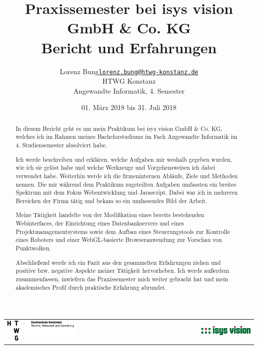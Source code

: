 \documentclass[xcolor=dvipsnames,11pt,paper=a4paper]{report}
\title{
	\Huge\textbf{Praxissemester bei isys vision GmbH \& Co. KG}\\\vspace{20pt}
	\huge{Bericht und Erfahrungen}
}
\author{
	\begin{tabular}{l l}
	Lorenz Bung &
	\href{mailto:lorenz.bung@htwg-konstanz.de}{\texttt{lorenz.bung@htwg-konstanz.de}}\\
	&HTWG Konstanz\\
	&Angewandte Informatik, 4. Semester
	\end{tabular}
}
\date{01. März 2018 bis 31. Juli 2018}
\begin{document}

\begin{titlepage}
\begin{tabular}{l r}
\includegraphics[width=0.5\textwidth]{media/htwg.png} &
\includegraphics[width=0.5\textwidth]{media/isys.png}
\end{tabular}
{\let\newpage\relax\maketitle}
\end{titlepage}

\begin{abstract}
In diesem Bericht geht es um mein Praktikum bei isys vision GmbH \& Co. KG, welches
ich im Rahmen meines Bachelorstudiums im Fach Angewandte Informatik im 4. Studiensemester
absolviert habe.

Ich werde beschreiben und erklären, welche Aufgaben mir weshalb gegeben wurden,
wie ich sie gelöst habe und welche Werkzeuge und Vorgehensweisen ich dabei verwendet
habe. Weiterhin werde ich die firmeninternen Abläufe, Ziele und Methoden nennen.
Die mir während dem Praktikum zugeteilten Aufgaben umfassten ein breites Spektrum mit dem Fokus
Webentwicklung und Javascript. Dabei war ich in mehreren Bereichen der Firma
tätig und bekam so ein umfassendes Bild der Arbeit.

Meine Tätigkeit handelte von der Modifikation eines bereits bestehenden Webinterfaces, der Einrichtung eines Datenbankservers und eines Projektmanagementsystems sowie dem Aufbau eines Steuerungstools zur Kontrolle eines Roboters und einer WebGL-basierte Browseranwendung zur Vorschau von Punktwolken.

Abschließend werde ich ein Fazit aus den gesammelten Erfahrungen ziehen und positive
bzw. negative Aspekte meiner Tätigkeit hervorheben. Ich werde außerdem zusammenfassen,
inwiefern das Praxissemester mich weiter gebracht hat und mein akademisches Profil
durch praktische Erfahrung abrundet.
\end{abstract}
\pagebreak
\end{document}
